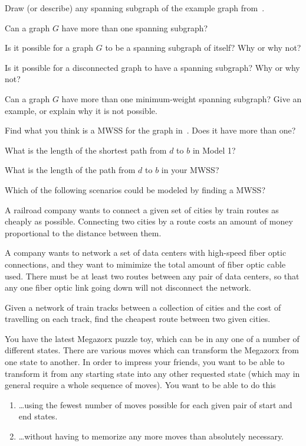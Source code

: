 \documentclass{tufte-handout}
\begin{document}
\begin{questions}
\item \label{q:draw-ss} Draw (or describe) any spanning subgraph of the example
  graph from~.
\item Can a graph $G$ have more than one spanning subgraph?
\item Is it possible for a graph $G$ to be a spanning subgraph of
  itself?  Why or why not?
\item Is it possible for a disconnected graph to have a spanning
  subgraph?  Why or why not?
\item Can a graph $G$ have more than one minimum-weight spanning
  subgraph?  Give an example, or explain why it is not possible.
\item Find what you think is a MWSS for the graph in~. Does it have
  more than one?
\item What is the length of the shortest path from $d$ to $b$ in Model 1?
\item What is the length of the path from $d$ to $b$ in your MWSS?
\item \label{q:scenarios} Which of the following scenarios could be
  modeled by finding a MWSS?
  \begin{subquestions}
  \item A railroad company wants to connect a given set of cities by
    train routes as cheaply as possible. Connecting two cities by a
    route costs an amount of money proportional to the distance
    between them.
  \item A company wants to network a set of data centers with
    high-speed fiber optic connections, and they want to mimimize the
    total amount of fiber optic cable used. There must be at least two
    routes between any pair of data centers, so that any one fiber
    optic link going down will not disconnect the network.
  \item Given a network of train tracks between a collection of cities
    and the cost of travelling on each track, find the cheapest route
    between two given cities.
  \item You have the latest Megazorx puzzle toy, which can be in any
    one of a number of different states.  There are various moves
    which can transform the Megazorx from one state to another.  In
    order to impress your friends, you want to be able to transform it
    from any starting state into any other requested state (which may
    in general require a whole sequence of moves). You want to be able
    to do this
    \begin{enumerate}[label=(\roman*)]
    \item \dots using the fewest number of moves possible for each
      given pair of start and end states.
    \item \dots without having to memorize any more moves than
      absolutely necessary.
    \end{enumerate}
  \end{subquestions}


\end{questions}
\end{document}
